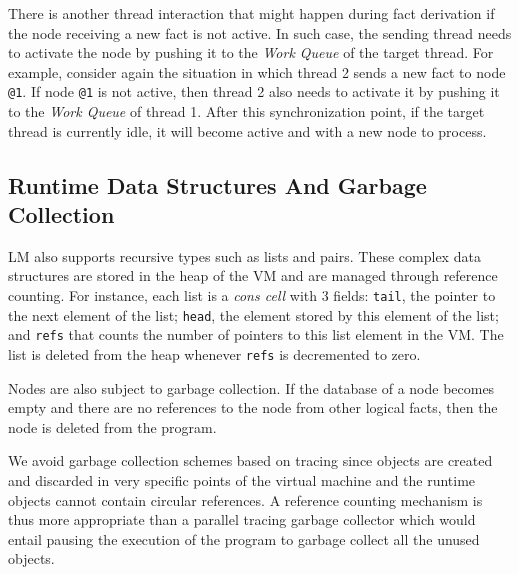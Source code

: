 There is another thread interaction that might happen during fact derivation if
the node receiving a new fact is not active. In such case, the sending thread
needs to activate the node by pushing it to the \emph{Work Queue} of the target
thread. For example, consider again the situation in which thread 2 sends a new
fact to node \texttt{@1}. If node \texttt{@1} is not active, then thread 2 also
needs to activate it by pushing it to the \emph{Work Queue} of thread 1. After
this synchronization point, if the target thread is currently idle, it will
become active and with a new node to process.

\subsection{Runtime Data Structures And Garbage Collection}

LM also supports recursive types such as lists and pairs. These complex data
structures are stored in the heap of the VM and are managed through reference
counting. For instance, each list is a \emph{cons cell} with 3 fields:
\texttt{tail}, the pointer to the next element of the list; \texttt{head}, the
element stored by this element of the list; and \texttt{refs} that counts the
number of pointers to this list element in the VM. The list is deleted from the
heap whenever \texttt{refs} is decremented to zero.

Nodes are also subject to garbage collection. If the database of a node becomes
empty and there are no references to the node from other logical facts, then
the node is deleted from the program.

We avoid garbage collection schemes based on tracing since objects are created
and discarded in very specific points of the virtual machine and the runtime
objects cannot contain circular references. A reference counting mechanism is
thus more appropriate than a parallel tracing garbage collector which would
entail pausing the execution of the program to garbage collect all the unused
objects.

